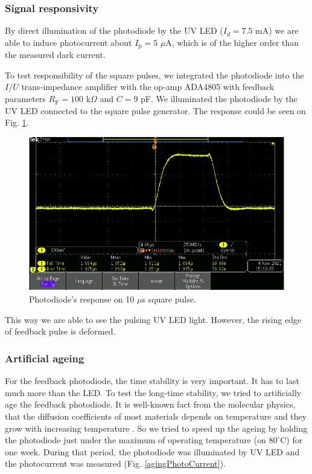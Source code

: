 \subsubsection{Signal responsivity}
By direct illumination of the photodiode by the UV LED ($I_d = 7.5 $ mA) we are able to induce photocurrent about $I_\textrm{p} = 5$ $\mu$A, which is of the higher order than the measured dark current.
\par
To test responsibility of the square pulses, we integrated the photodiode into the $I/U$ trans-impedance amplifier with the op-amp ADA4805 with feedback parameters $R_\textrm{F} = 100$ k$\Omega$ and $C = 9$ pF. We illuminated the photodiode by the UV LED connected to the square pulse generator. The response could be seen on Fig. \ref{response}.

\begin{figure}[H]
 \centering
 \includegraphics[scale=0.5]{./pictures/pulse}
 \caption{Photodiode's response on 10 $\mu$s square pulse.}
 \label{response}
\end{figure}


This way we are able to see the pulsing UV LED light. However, the rising edge of feedback pulse is deformed. 

\subsubsection{Artificial ageing}
For the feedback photodiode, the time stability is very important. It has to last much more than the LED. To test the long-time stability, we tried to artificially age the feedback photodiode. It is well-known fact from the molecular physics, that the diffusion coefficients of most materials depends on temperature and they grow with increasing temperature \cite{Diff}. So we tried to speed up the ageing by holding the photodiode just under the maximum of operating temperature (on $80^{\circ}$C) for one week. During that period, the photodiode was illuminated by UV LED and the photocurrent was measured (Fig. \ref{agingPhotoCurrent}).


